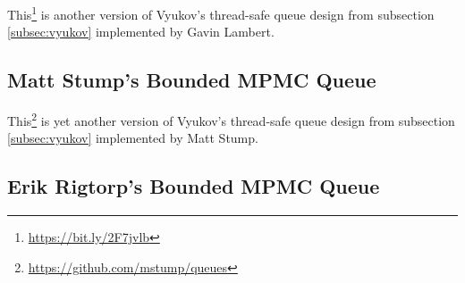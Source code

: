 	This\footnote{\url{https://bit.ly/2F7jvlb}} is another version of Vyukov's thread-safe queue design from subsection \ref{subsec:vyukov} implemented by Gavin Lambert.

%
%	
%	
%
\subsection[Matt Stump's MPMC Queue]{Matt Stump's Bounded MPMC Queue} \label{subsec:vyukov-variation}

	This\footnote{\url{https://github.com/mstump/queues}} is yet another version of Vyukov's thread-safe queue design from subsection \ref{subsec:vyukov} implemented by Matt Stump.

\subsection[Erik Rigtorp's MPMC Queue]{Erik Rigtorp's Bounded MPMC Queue} \label{subsec:rigtorp}

